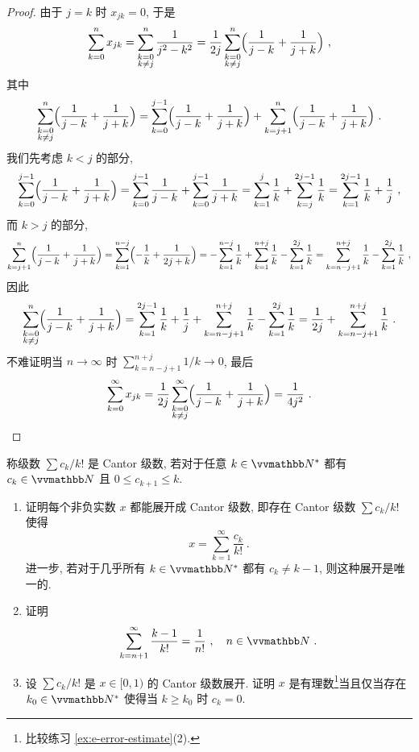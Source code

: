 \begin{proof}
    由于 \(j = k\) 时 \(x_{j k} = 0\), 于是
    \[
        \sum_{k = 0}^n x_{j k} = \sum_{\substack{k = 0 \\ k \neq j}}^n \frac{1}{j^2 - k^2} = \frac{1}{2 j} \sum_{\substack{k = 0 \\ k \neq j}}^n \Bigl(\frac{1}{j - k} + \frac{1}{j + k}\Bigr)\ ,
    \]
    其中
    \[
        \sum_{\substack{k = 0 \\ k \neq j}}^n \Bigl(\frac{1}{j - k} + \frac{1}{j + k}\Bigr) = \sum_{k = 0}^{j - 1} \Bigl(\frac{1}{j - k} + \frac{1}{j + k}\Bigr) + \sum_{k = j + 1}^n \Bigl(\frac{1}{j - k} + \frac{1}{j + k}\Bigr)\ .
    \]
    我们先考虑 \(k < j\) 的部分,
    \[
        \sum_{k = 0}^{j - 1} \Bigl(\frac{1}{j - k} + \frac{1}{j + k}\Bigr) = \sum_{k = 0}^{j - 1} \frac{1}{j - k} + \sum_{k = 0}^{j - 1} \frac{1}{j + k} = \sum_{k = 1}^j \frac{1}{k} + \sum_{k = j}^{2 j - 1} \frac{1}{k} = \sum_{k = 1}^{2 j - 1} \frac{1}{k} + \frac{1}{j}\ ,
    \]
    而 \(k > j\) 的部分,
    \[
        \sum_{k = j + 1}^n \Bigl(\frac{1}{j - k} + \frac{1}{j + k}\Bigr) = \sum_{k = 1}^{n - j} \Bigl(- \frac{1}{k} + \frac{1}{2 j + k}\Bigr) = - \sum_{k = 1}^{n - j} \frac{1}{k} + \sum_{k = 1}^{n + j} \frac{1}{k} - \sum_{k = 1}^{2 j} \frac{1}{k} = \sum_{k = n - j + 1}^{n + j} \frac{1}{k} - \sum_{k = 1}^{2 j} \frac{1}{k}\ ,
    \]
    因此
    \[
        \sum_{\substack{k = 0 \\ k \neq j}}^n \Bigl(\frac{1}{j - k} + \frac{1}{j + k}\Bigr) = \sum_{k = 1}^{2 j - 1} \frac{1}{k} + \frac{1}{j} + \sum_{k = n - j + 1}^{n + j} \frac{1}{k} - \sum_{k = 1}^{2 j} \frac{1}{k} = \frac{1}{2 j} + \sum_{k = n - j + 1}^{n + j} \frac{1}{k}\ .
    \]
    不难证明当 \(n \to \infty\) 时 \(\sum_{k = n - j + 1}^{n + j} 1 / k \to 0\), 最后
    \[
        \sum_{k = 0}^\infty x_{j k} = \frac{1}{2 j} \sum_{\substack{k = 0 \\ k \neq j}}^\infty \Bigl(\frac{1}{j - k} + \frac{1}{j + k}\Bigr) = \frac{1}{4 j^2}\ .
    \]
\end{proof}

\begin{exercise}
    称级数 \(\sum c_k / k!\) 是 Cantor 级数, 若对于任意 \(k \in \N^\ast\) 都有 \(c_k \in \N\) 且 \(0 \leq c_{k + 1} \leq k\).
    \begin{enumerate}
        \item 证明每个非负实数 \(x\) 都能展开成 Cantor 级数, 即存在 Cantor 级数 \(\sum c_k / k!\) 使得
        \[
            x = \sum_{k = 1}^\infty \frac{c_k}{k!}\ .
        \]
        进一步, 若对于几乎所有 \(k \in \N^\ast\) 都有 \(c_k \neq k - 1\), 则这种展开是唯一的.
        \item 证明
        \[
            \sum_{k = n + 1}^\infty \frac{k - 1}{k!} = \frac{1}{n!}\ ,\quad n \in \N\ .
        \]
        \item 设 \(\sum c_k / k!\) 是 \(x \in [0, 1)\) 的 Cantor 级数展开. 证明 \(x\) 是有理数\footnote{比较练习 \ref{ex:e-error-estimate}(2).}当且仅当存在 \(k_0 \in \N^\ast\) 使得当 \(k \geq k_0\) 时 \(c_k = 0\).
    \end{enumerate}
\end{exercise}

